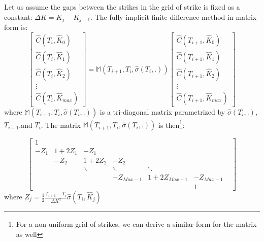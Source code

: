 \documentclass[letterpaper,12pt,titlepage,oneside,final]{book}
\numberwithin{equation}{section}
\theoremstyle{definition}
\begin{document}
 Let us assume the gaps between the strikes in the grid of strike is fixed as a constant: $\Delta K= K_{j}-K_{j-1}$.
The fully implicit finite difference method in matrix form is:
\begin{equation}
	\begin{bmatrix}
\widehat{C}(T_{i},\widehat{K}_0)\\
\widehat{C}(T_{i},\widehat{K}_1)\\
\widehat{C}(T_{i},\widehat{K}_2)\\
\vdots\\
\widehat{C}(T_{i},\widehat{K}_{max})
\end{bmatrix}=\mathcal{\mathbb{M}}(T_{i+1},T_{i}, \widehat{\sigma}(T_i,.))
\begin{bmatrix}
\widehat{C}(T_{i+1},\widehat{K}_0)\\
\widehat{C}(T_{i+1},\widehat{K}_1)\\
\widehat{C}(T_{i+1},\widehat{K}_2)\\
\vdots\\
\widehat{C}(T_{i+1},\widehat{K}_{max})
\end{bmatrix}
\label{eq:LVFInt}
\end{equation}
where $\mathcal{\mathbb{M}}(T_{i+1},T_{i}, \widehat{\sigma}(T_i,.))$ is a tri-diagonal matrix parametrized by  $\widehat{\sigma}(T_i,.)$,  $T_{i+1}$,and $T_{i}$.  The matrix  $\mathcal{\mathbb{M}}(T_{i+1},T_{i}, \widehat{\sigma}(T_i,.))$ is then\footnote{For a non-uniform grid of strikes, we can derive a similar form for the matrix as well}:

\begin{equation}
	\begin{bmatrix}
1&&&&&\\
-Z_1&1+2Z_1&-Z_1&&&\\
&-Z_2&1+2Z_2&-Z_2&&&\\
&&\ddots&\ddots&\ddots&&\\
&&&-Z_{Max-1}&1+2Z_{Max-1}&-Z_{Max-1}\\
&&&&&1
\end{bmatrix}
\label{eq:LVFMatrix}
\end{equation}
where $Z_j=\frac{1}{2}\frac{T_{i+1}-T_{i}}{\Delta K^2}\widehat{\sigma}(T_i,\widehat{K}_j)$
\end{document}
